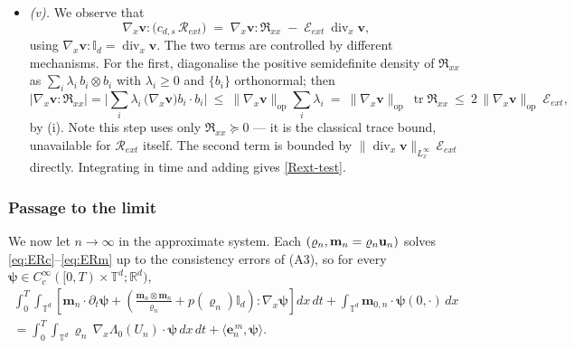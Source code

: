 \documentclass[12pt,a4paper,twoside]{article}
\newcommand{\Div}{\operatorname{div}}
\newcommand{\vr}{\varrho}
\newcommand{\vu}{\vc{u}}
\newcommand{\vc}[1]{{\bf #1}}
\newcommand{\Grad}{\nabla}
\numberwithin{equation}{section}%
\begin{document}
\begin{pf}
\begin{itemize}[leftmargin=*]
To upgrade the bound, write $\mathbb A:=d\mathfrak R_{xx}/d\mathcal E_{ext}$; by \eqref{Rext-str},
$\mathbb D=\mathbb A-\mathbb I_d$ with $\mathbb A\succeq0$ and $\operatorname{tr}\mathbb A\le2$
$\,\mathcal E_{ext}$-a.e.\ (by~(i)). A positive semidefinite matrix with trace $\le2$ has all
eigenvalues in $[0,2]$, so $\mathbb A$ has spectrum in $[0,2]$ and $\mathbb D=\mathbb A-\mathbb I_d$
spectrum in $[-1,1]$; since $\mathbb D$ is symmetric,
$\|\mathbb D\|_{L^\infty(\overline\Omega,\,\mathcal E_{ext})}\le1$, and in particular
$\mathbb D\in L^\infty(\overline\Omega,\mathcal E_{ext};\mathbb R^{d\times d}_{\mathrm{sym}})$.
		\item[-] \emph{(v).} We observe that
		\[
		\Grad_x\mathbf v : \big(c_{d,s}\,\mathcal R_{ext}\big)
		\;=\; \Grad_x \mathbf v : \mathfrak R_{xx} \;-\; \mathcal E_{ext}\ \Div_x\mathbf v ,
		\]
		using $\Grad_x\mathbf v : \mathbb I_d = \Div_x\mathbf v$. The two terms are controlled by different mechanisms. For the first, diagonalise the positive semidefinite density of $\mathfrak R_{xx}$ as $\sum_{i} \lambda_i\, b_i\otimes b_i$ with $\lambda_i \ge 0$ and $\{b_i\}$ orthonormal; then
		\[
		\big| \Grad_x\mathbf v : \mathfrak R_{xx} \big|
		= \Big| \sum_i \lambda_i \, \big(\Grad_x\mathbf v\big) b_i \cdot b_i \Big|
		\ \le\ \|\Grad_x\mathbf v\|_{\mathrm{op}} \sum_i \lambda_i
		\ =\ \|\Grad_x\mathbf v\|_{\mathrm{op}}\ \operatorname{tr}\mathfrak R_{xx}
		\ \le\ 2\,\|\Grad_x\mathbf v\|_{\mathrm{op}}\ \mathcal E_{ext},
		\]
		by (i). Note this step uses only $\mathfrak R_{xx}\succeq0$ --- it is the classical trace bound, unavailable for $\mathcal R_{ext}$ itself. The second term is bounded by $\|\Div_x\mathbf v\|_{L^\infty_x}\,\mathcal E_{ext}$ directly. Integrating in time and adding gives \eqref{Rext-test}.
	\end{itemize}

\end{pf}


	


\subsubsection{Passage to the limit}
\label{sec:stability-conclusion}

We now let $n\to\infty$ in the approximate system. Each $(\vr_n,\mathbf m_n=\vr_n \vu_n)$ solves \eqref{eq:ERc}--\eqref{eq:ERm} up to the consistency errors of (A3), so for every $\pmb\psi \in C_c^\infty([0,T)\times\mathbb T^d;\mathbb R^d)$,
\begin{align*}
	\int_0^T\!\!\int_{\mathbb T^d} \left[ \mathbf m_n\cdot\partial_t\pmb\psi + \left( \frac{\mathbf m_n\otimes\mathbf m_n}{\vr_n} + p(\vr_n)\mathbb I_d \right) : \Grad_x\pmb\psi \right] dx\,dt
	+ \int_{\mathbb T^d} \mathbf m_{0,n}\cdot\pmb\psi(0,\cdot)\,dx
	\\	= \int_0^T\!\!\int_{\mathbb T^d} \vr_n\, \Grad_x\Lambda_0(U_n)\cdot\pmb\psi \,dx\,dt +\big\langle \mathbf{e}_n^{\,m}, \pmb\psi \big\rangle   .
\end{align*}
\end{document}
